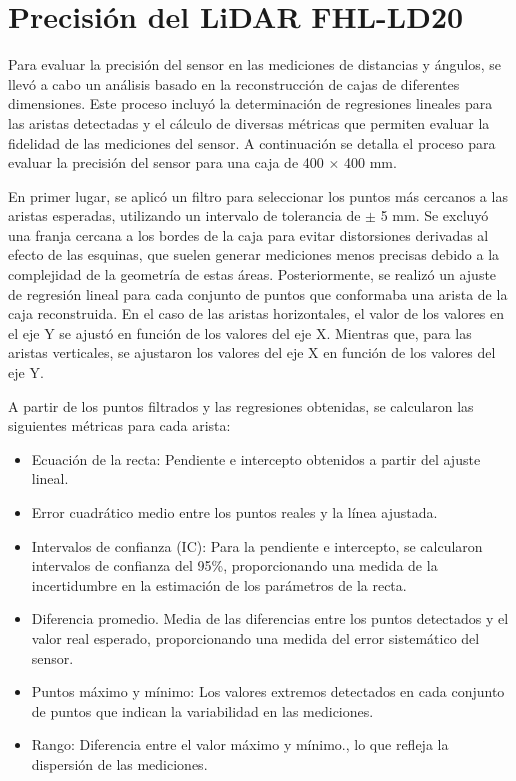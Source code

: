 \section{Precisión del LiDAR FHL-LD20}
Para evaluar la precisión del sensor en las mediciones de distancias y ángulos, se llevó a cabo un análisis basado en la reconstrucción de cajas de diferentes dimensiones. Este proceso incluyó la determinación de regresiones lineales para las aristas detectadas y el cálculo de diversas métricas que permiten evaluar la fidelidad de las mediciones del sensor. A continuación se detalla el proceso para evaluar la precisión del sensor para una caja de 400 $\times$ 400 mm.

En primer lugar, se aplicó un filtro para seleccionar los puntos más cercanos a las aristas esperadas, utilizando un intervalo de tolerancia de $\pm$ 5 mm. Se excluyó una franja cercana a los bordes de la caja para evitar distorsiones derivadas al efecto de las esquinas, que suelen generar mediciones menos precisas debido a la complejidad de la geometría de estas áreas. Posteriormente, se realizó un ajuste de regresión lineal para cada conjunto de puntos que conformaba una arista de la caja reconstruida. En el caso de las aristas horizontales, el valor de los valores en el eje Y se ajustó en función de los valores del eje X. Mientras que, para las aristas verticales, se ajustaron los valores del eje X en función de los valores del eje Y. 

A partir de los puntos filtrados y las regresiones obtenidas, se calcularon las siguientes métricas para cada arista:
\begin{itemize}
	\item Ecuación de la recta: Pendiente e intercepto obtenidos a partir del ajuste lineal.
	\item Error cuadrático medio entre los puntos reales y la línea ajustada.
	\item Intervalos de confianza (IC): Para la pendiente e intercepto, se calcularon intervalos de confianza del 95\%, proporcionando una medida de la incertidumbre en la estimación de los parámetros de la recta.
	\item Diferencia promedio. Media de las diferencias entre los puntos detectados y el valor real esperado, proporcionando una medida del error sistemático del sensor.
	\item Puntos máximo y mínimo: Los valores extremos detectados en cada conjunto de puntos que indican la variabilidad en las mediciones.
	\item Rango: Diferencia entre el valor máximo y mínimo., lo que refleja la dispersión de las mediciones.
\end{itemize}

